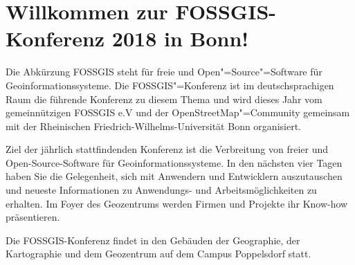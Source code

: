 \newpage
\section*{Willkommen zur FOSSGIS-Konferenz 2018 in Bonn!} \label{welcome}
Die Abkürzung FOSSGIS steht
für freie und Open"=Source"=Software für Geoinformationssysteme.
Die FOSSGIS"=Konferenz ist im deutschsprachigen Raum die führende Konferenz zu diesem Thema
und wird dieses Jahr vom gemeinnützigen FOSSGIS e.V und der OpenStreetMap"=Community
gemeinsam mit der Rheinischen Friedrich-Wilhelms-Universität Bonn organisiert.

Ziel der jährlich stattfindenden Konferenz ist die Verbreitung von freier und
Open-Source-Software für Geoinformationssysteme.  In den nächsten vier Tagen
haben Sie die Gelegenheit, sich mit Anwendern und Entwicklern auszutauschen und
neueste Informationen zu Anwendungs- und Arbeitsmöglichkeiten zu erhalten. Im
Foyer des Geozentrums werden Firmen und Projekte ihr Know-how präsentieren.

Die FOSSGIS-Konferenz findet in den Gebäuden der Geographie, der Kartographie und dem Geozentrum auf dem Campus Poppelsdorf statt.

\newpage



